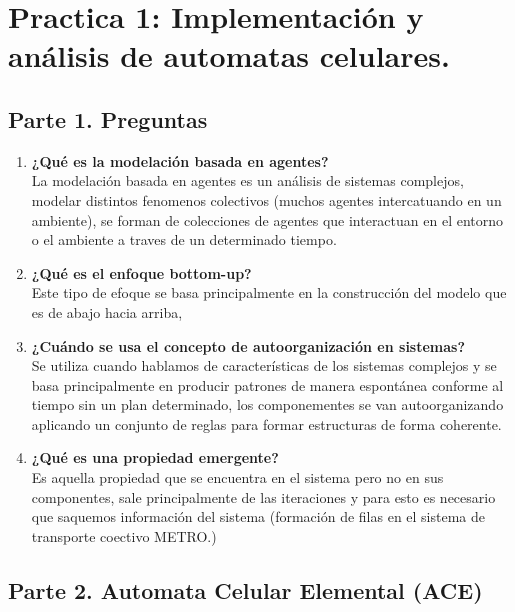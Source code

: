 \documentclass[12pt]{article}
\begin{document}

{\color{red} \section*{Practica 1: Implementación y análisis de automatas celulares.}}

{\color{blue} \subsection*{Parte 1. Preguntas}}
\vspace{1em}

\begin{enumerate}
    \item \textbf{¿Qué es la modelación basada en agentes?}\\
    La modelación basada en agentes es un análisis de sistemas complejos, modelar distintos fenomenos
    colectivos (muchos agentes intercatuando en un ambiente), se forman de colecciones de agentes que interactuan en el entorno o el ambiente a traves de un determinado tiempo.

    \item \textbf{¿Qué es el enfoque bottom-up?}\\
    Este tipo de efoque se basa principalmente en la construcción del modelo que es de abajo hacia arriba,
    \item \textbf{¿Cuándo se usa el concepto de autoorganización en sistemas?}\\
    Se utiliza cuando hablamos de características de los sistemas complejos y se basa principalmente en producir patrones
    de manera espontánea conforme al tiempo sin un plan determinado, los componementes se van autoorganizando aplicando un conjunto de reglas para formar estructuras
    de forma coherente.
    \item \textbf{¿Qué es una propiedad emergente?}\\
    Es aquella propiedad que se encuentra en el sistema pero no en sus componentes, sale principalmente de las iteraciones y para esto es necesario que saquemos
    información del sistema (formación de filas en el sistema de transporte coectivo METRO.)
\end{enumerate}

{\color{blue} \subsection*{Parte 2. Automata Celular Elemental (ACE)}}
\vspace{1em}
\end{document}
